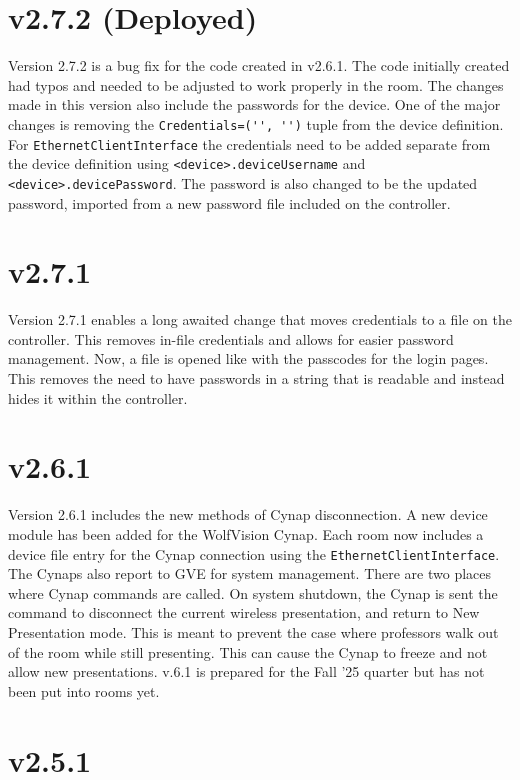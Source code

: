 \documentclass{article}
\begin{document}
\section*{v2.7.2 (Deployed)}

Version 2.7.2 is a bug fix for the code created in v2.6.1. The code initially created had typos and needed to be adjusted to work 
properly in the room. The changes made in this version also include the passwords for the device. One of the major changes is 
removing the \lstinline|Credentials=('', '')| tuple from the device definition. For \lstinline|EthernetClientInterface| the 
credentials need to be added separate from the device definition using \lstinline|<device>.deviceUsername| and 
\lstinline|<device>.devicePassword|. The password is also changed to be the updated password, imported from a new password 
file included on the controller. 

\section*{v2.7.1}

Version 2.7.1 enables a long awaited change that moves credentials to a file on the controller. This removes in-file credentials 
and allows for easier password management. Now, a file is opened like with the passcodes for the login pages. This removes the need
to have passwords in a string that is readable and instead hides it within the controller. 

\section*{v2.6.1}

Version 2.6.1 includes the new methods of Cynap disconnection. A new device module has been added for the WolfVision Cynap. 
Each room now includes a device file entry for the Cynap connection using the \lstinline|EthernetClientInterface|. The Cynaps
also report to GVE for system management. There are two places where Cynap commands are called. On system shutdown, the 
Cynap is sent the command to disconnect the current wireless presentation, and return to New Presentation mode. This is meant
to prevent the case where professors walk out of the room while still presenting. This can cause the Cynap to freeze and not 
allow new presentations. v.6.1 is prepared for the Fall '25 quarter but has not been put into rooms yet. 

\section*{v2.5.1}
\end{document}
